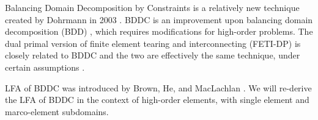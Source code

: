 Balancing Domain Decomposition by Constraints is a relatively new technique created by Dohrmann in 2003 \cite{dohrmann2003preconditioner}.
BDDC is an improvement upon balancing domain decomposition (BDD) \cite{mandel1993balancing}, which requires modifications for high-order problems.
The dual primal version of finite element tearing and interconnecting (FETI-DP) \cite{farhat2000scalable} is closely related to BDDC and the two are effectively the same technique, under certain assumptions \cite{mandel2007bddc}.

LFA of BDDC was introduced by Brown, He, and MacLachlan \cite{brown2019local}.
We will re-derive the LFA of BDDC in the context of high-order elements, with single element and marco-element subdomains.


